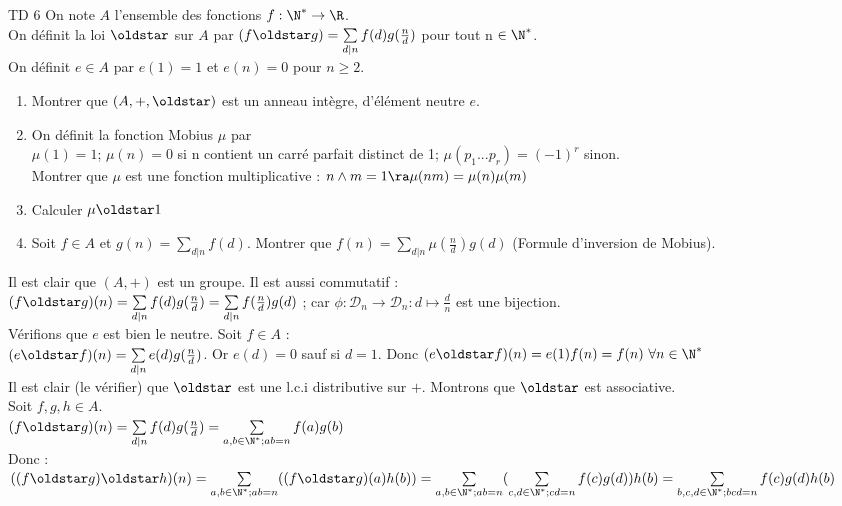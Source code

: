 \documentclass[11pt]{article}
\begin{document}
\begin{exercice}{TD 6}{}
    On note $A $ l'ensemble des fonctions $f : \N^* \to \R $. \\
    On définit la loi $\oldstar$ sur $A$ par $(f \oldstar g) = \sum\limits_{d\mid n}f(d)g(\frac n d)$ pour tout n $\in \N^*$. \\
    On définit $e \in A$ par $e(1) = 1$ et $e(n) = 0$ pour $n \ge 2$.
    \begin{enumerate}
        \item Montrer que $(A, +, \oldstar)$ est un anneau intègre, d'élément neutre $e$.
        \item On définit la fonction Mobius $\mu$ par \\
            $\mu (1) = 1$; $\mu (n) = 0$ si n contient un carré parfait distinct de 1; $\mu(p_1...p_r) = (-1)^r$ sinon. \\
            Montrer que $\mu$ est une fonction multiplicative : $n \land m = 1 \ra \mu(nm) = \mu(n) \mu(m)$
        \item Calculer $\mu \oldstar 1$
        \item Soit $f \in A$ et $g(n) = \sum\limits_{d|n}^{} f(d)$. Montrer que $f(n) = \sum\limits_{d|n}^{}\mu(\frac n d)g(d)$ (Formule d'inversion de Mobius).
    \end{enumerate}
    \tcblower
     Il est clair que $ (A, +)$ est un groupe. Il est aussi commutatif : \\
    $(f \oldstar g)(n) = \sum\limits_{d | n}f(d)g(\frac n d) = \sum\limits_{d | n}f(\frac n d)g(d)$ ; car $\phi : \mathcal D_n \to \mathcal D_n : d \mapsto \frac d n$ est une bijection.\\
    Vérifions que $e$ est bien le neutre. Soit $f \in A$ :\\
    $(e \oldstar f)(n) = \sum\limits_{d | n}e(d)g(\frac n d)$. Or $e(d) = 0$ sauf si $d = 1$. Donc $(e \oldstar f)(n) = e(1)f(n) = f(n) \ \forall n \in \N^* $\\
    Il est clair (le vérifier) que $ \oldstar$ est une l.c.i distributive sur $+$. Montrons que $ \oldstar $ est associative.\\
    Soit $f, g, h \in A$. \\
    $(f \oldstar g)(n) = \sum\limits_{d | n} f(d)g(\frac n d) = \sum\limits_{a, b \in \N^*; ab=n} f(a)g(b)$\\
    Donc :\\
    $((f \oldstar g) \oldstar h)(n) = \sum\limits_{a, b \in \N^*; ab=n}((f \oldstar g)(a)h(b)) = \sum\limits_{a, b \in \N^*; ab=n}(\sum\limits_{c, d \in \N^*; cd=n}f(c)g(d))h(b) = \sum\limits_{b, c, d \in \N^*; bcd=n}f(c)g(d)h(b)$\\

\end{exercice}
\end{document}
